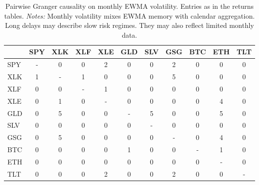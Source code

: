 \begin{table}[H]
\centering
\small
\begin{tabular}{lcccccccccc}
\toprule
 & SPY & XLK & XLF & XLE & GLD & SLV & GSG & BTC & ETH & TLT \\
\midrule
SPY & - & 0 & 0 & 2 & 0 & 0 & 2 & 0 & 0 & 0 \\
XLK & 1 & - & 1 & 0 & 0 & 0 & 5 & 0 & 0 & 0 \\
XLF & 0 & 0 & - & 1 & 0 & 0 & 0 & 0 & 0 & 0 \\
XLE & 0 & 1 & 0 & - & 0 & 0 & 0 & 0 & 4 & 0 \\
GLD & 0 & 5 & 0 & 0 & - & 5 & 0 & 0 & 5 & 0 \\
SLV & 0 & 0 & 0 & 0 & 0 & - & 0 & 0 & 0 & 0 \\
GSG & 0 & 5 & 0 & 0 & 0 & 0 & - & 0 & 4 & 0 \\
BTC & 0 & 0 & 0 & 0 & 1 & 0 & 0 & - & 1 & 0 \\
ETH & 0 & 0 & 0 & 0 & 0 & 0 & 0 & 0 & - & 0 \\
TLT & 0 & 0 & 0 & 2 & 0 & 0 & 2 & 0 & 0 & - \\
\bottomrule
\end{tabular}
\caption{Pairwise Granger causality on monthly EWMA volatility. Entries as in the returns tables. \textit{Notes:} Monthly volatility mixes EWMA memory with calendar aggregation. Long delays may describe slow risk regimes. They may also reflect limited monthly data.}
\label{tab:vol_monthly}
\end{table}
